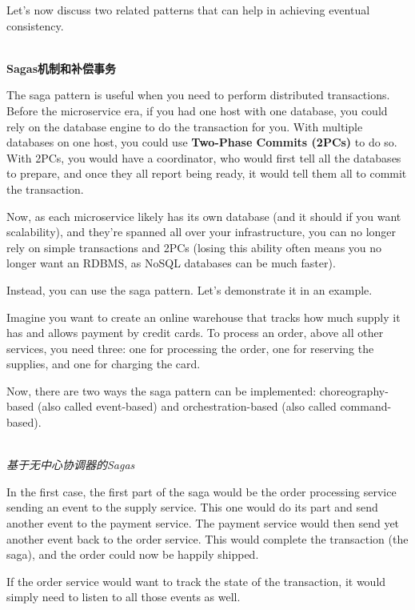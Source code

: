 Let's now discuss two related patterns that can help in achieving eventual consistency.

\hspace*{\fill} \\ %
\noindent
\textbf{Sagas机制和补偿事务}

The saga pattern is useful when you need to perform distributed transactions. Before the microservice era, if you had one host with one database, you could rely on the database engine to do the transaction for you. With multiple databases on one host, you  could use\textbf{ Two-Phase Commits (2PCs)} to do so. With 2PCs, you would have a coordinator, who would first tell all the databases to prepare, and once they all report being ready, it would tell them all to commit the transaction.

Now, as each microservice likely has its own database (and it should if you want scalability), and they're spanned all over your infrastructure, you can no longer rely on simple transactions and 2PCs (losing this ability often means you no longer want an RDBMS, as NoSQL databases can be much faster).

Instead, you can use the saga pattern. Let's demonstrate it in an example.

Imagine you want to create an online warehouse that tracks how much supply it has and allows payment by credit cards. To process an order, above all other services, you need three: one for processing the order, one for reserving the supplies, and one for charging the card.

Now, there are two ways the saga pattern can be implemented: choreography-based (also called event-based) and orchestration-based (also called command-based).


\hspace*{\fill} \\ %
\noindent
\textit{基于无中心协调器的Sagas}

In the first case, the first part of the saga would be the order processing service sending an event to the supply service. This one would do its part and send another event to the payment service. The payment service would then send yet another event back to the order service. This would complete the transaction (the saga), and the order could now be happily shipped.

If the order service would want to track the state of the transaction, it would simply need to listen to all those events as well.

